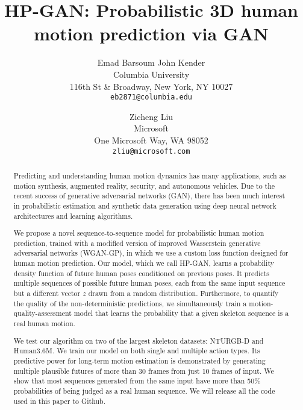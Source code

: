 \documentclass[10pt,twocolumn,letterpaper]{article}
\begin{document}
\title{HP-GAN: Probabilistic 3D human motion prediction via GAN}

\author{Emad Barsoum \qquad John Kender\\
Columbia University\\
116th St \& Broadway, New York, NY 10027\\
{\tt\small eb2871@columbia.edu} 
\and
Zicheng Liu\\
Microsoft\\
One Microsoft Way, WA 98052\\
{\tt\small zliu@microsoft.com}
}

\maketitle




\begin{abstract}

Predicting and understanding human motion dynamics has many applications, such as motion synthesis, augmented reality, security, and autonomous vehicles. Due to the recent success of generative adversarial networks (GAN), there has been much interest in probabilistic estimation and synthetic data generation using deep neural network architectures and learning algorithms.

We propose a novel sequence-to-sequence model for probabilistic human motion prediction, trained with a modified version of improved Wasserstein generative adversarial networks (WGAN-GP), in which we use a custom loss function designed for human motion prediction. Our
model, which we call HP-GAN, learns a probability density function of future human poses conditioned on previous poses. It predicts multiple sequences of possible future human poses, each from the same input sequence but a different vector $z$ drawn from a random distribution. Furthermore, to quantify the quality of the non-deterministic predictions, we simultaneously train a motion-quality-assessment model that learns the probability that a given skeleton sequence is a real human motion.

We test our algorithm on two of the largest skeleton datasets: NTURGB-D and Human3.6M. We train our model on both single and multiple action types. Its predictive power for long-term motion estimation is demonstrated by generating multiple plausible futures of more than 30 frames from just 10 frames of input. We show that most sequences generated from the same input have more than 50\% probabilities of being judged as a real human sequence. We will release all the code used in this paper to Github.

\end{abstract}
\end{document}
